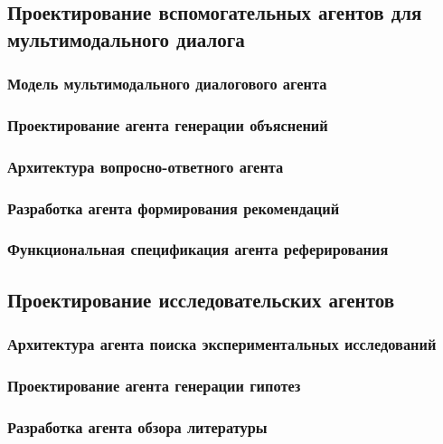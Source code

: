 \documentclass{syksu-coursework}
\begin{document}
\subsection{Проектирование вспомогательных агентов для мультимодального диалога}

\subsubsection{Модель мультимодального диалогового агента}

\subsubsection{Проектирование агента генерации объяснений}

\subsubsection{Архитектура вопросно-ответного агента}

\subsubsection{Разработка агента формирования рекомендаций}

\subsubsection{Функциональная спецификация агента реферирования}

\subsection{Проектирование исследовательских агентов}

\subsubsection{Архитектура агента поиска экспериментальных исследований}

\subsubsection{Проектирование агента генерации гипотез}

\subsubsection{Разработка агента обзора литературы}
\end{document}
